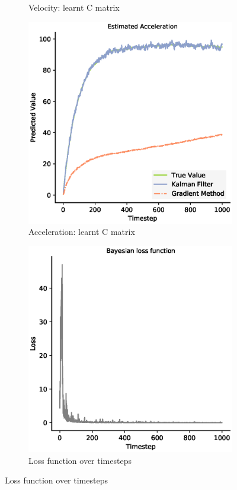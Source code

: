 \begin{figure}
\begin{subfigure}{0.49\textwidth}
 \caption{Velocity: learnt C matrix}
 \end{subfigure}
 \begin{subfigure}{0.49\textwidth}\quad
 \centering
 \includegraphics[width=.95\linewidth]{chapter_3_figures/Estimated_Acceleration_C_matrix.eps}
 \caption{Acceleration: learnt C matrix}
 \end{subfigure}
 \begin{subfigure}{0.49\textwidth}
 \centering
 \includegraphics[width=.95\linewidth]{chapter_3_figures/NKF_C_matrix_loss.eps}
 \caption{Loss function over timesteps}
 \end{subfigure}
 

\end{figure}
